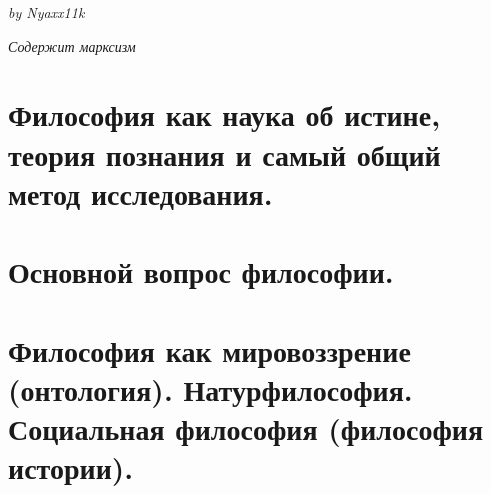 \begin{titlepage}
\begin{center}
\begin{flushright}
\sl\small
by Nyaxx11k\\
\end{flushright}
\begin{flushleft}
\hspace{20pt}
{\itshape Содержит марксизм}
\end{flushleft}
\end{center}
\end{titlepage}
\topmargin -1cm 
\hoffset -0.7in 
\textwidth 6.0in 
\textheight 9.0in 
\normalsize 
{}
\tableofcontents
\pagebreak

\section{ Философия как наука об истине, теория познания и самый общий метод исследования.}
\section{ Основной вопрос философии.}
\section{ Философия как мировоззрение (онтология). Натурфилософия. Социальная философия (философия истории).}
